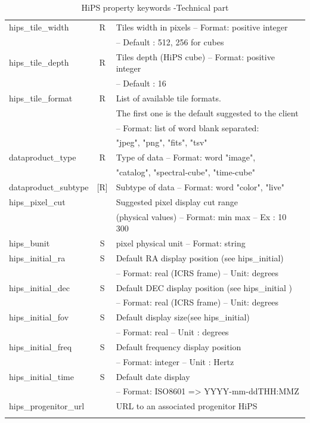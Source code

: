 \documentclass[11pt,a4paper]{ivoa}
\begin{document}
\begin{longtable}{|l|c|l|}
hips\_tile\_width & R & Tiles width in pixels – Format: positive integer\\ & & – Default : 512, 256 for cubes \\ \hline
hips\_tile\_depth & R & Tiles depth (HiPS cube) – Format: positive integer\\ & & – Default : 16 \\ \hline
hips\_tile\_format & R & List of available tile formats.\\ & & The first one is the default suggested to the client \\
 & &  – Format: list of word blank separated:\\ & &  "jpeg", "png", "fits", "tsv" \\ \hline
dataproduct\_type & R & Type of data – Format: word "image",\\ & & "catalog", "spectral-cube", "time-cube" \\ \hline
dataproduct\_subtype & [R] & Subtype of data – Format: word "color", "live" \\ \hline
hips\_pixel\_cut &   & Suggested pixel display cut range\\ & & (physical values) – Format: min max – Ex : 10 300 \\ \hline
hips\_bunit & S  & pixel physical unit – Format: string \\ \hline
hips\_initial\_ra & S  & Default RA display position (see hips\_initial) \\ & & – Format: real (ICRS frame)  – Unit: degrees \\ \hline
hips\_initial\_dec & S & Default DEC display position (see hips\_initial )\\ & & – Format: real (ICRS frame) – Unit: degrees \\ \hline
hips\_initial\_fov & S & Default display size(see hips\_initial) \\ & &  – Format: real – Unit : degrees \\ \hline
hips\_initial\_freq & S & Default frequency display position \\
 &   & – Format: integer – Unit : Hertz  \\ \hline
hips\_initial\_time & S & Default date display \\
 &   &  –  Format: ISO8601  => YYYY-mm-ddTHH:MMZ \\ \hline
hips\_progenitor\_url &   & URL to an associated progenitor HiPS \\ \hline

\caption{HiPS property keywords -Technical part}
\label{tab:keywords}
\end{longtable}
\end{document}
